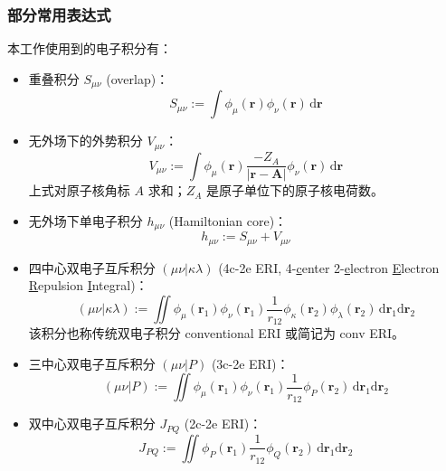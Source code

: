 \subsubsection{部分常用表达式}

本工作使用到的电子积分有：
\begin{itemize}[nosep]
  \item 重叠积分 $S_{\mu \nu}$ (overlap)：
        \begin{equation}
          S_{\mu \nu} := \int \phi_\mu (\bm{r}) \phi_\nu (\bm{r}) \, \mathrm{d} \bm{r}
        \end{equation}
  \item 无外场下的外势积分 $V_{\mu \nu}$：
        \begin{equation}
          V_{\mu \nu} := \int \phi_\mu (\bm{r}) \frac{- Z_A}{|\bm{r} - \bm{A}|} \phi_\nu (\bm{r}) \, \mathrm{d} \bm{r}
        \end{equation}
        上式对原子核角标 $A$ 求和；$Z_A$ 是原子单位下的原子核电荷数。
  \item 无外场下单电子积分 $h_{\mu \nu}$ (Hamiltonian core)：
        \begin{equation}
          h_{\mu \nu} := S_{\mu \nu} + V_{\mu \nu}
        \end{equation}
  \item 四中心双电子互斥积分 $(\mu \nu | \kappa \lambda)$ (4c-2e ERI, 4-\underline{c}enter 2-\underline{e}lectron \underline{E}lectron \underline{R}epulsion \underline{I}ntegral)：
        \begin{equation}
          (\mu \nu | \kappa \lambda) := \iint \phi_\mu (\bm{r}_1) \phi_\nu (\bm{r}_1) \frac{1}{r_{12}} \phi_\kappa (\bm{r}_2) \phi_\lambda (\bm{r}_2) \, \mathrm{d} \bm{r}_1 \mathrm{d} \bm{r}_2
        \end{equation}
        该积分也称传统双电子积分 conventional ERI 或简记为 conv ERI。
  \item 三中心双电子互斥积分 $(\mu \nu | P)$ (3c-2e ERI)：
        \begin{equation}
          (\mu \nu | P) := \iint \phi_\mu (\bm{r}_1) \phi_\nu (\bm{r}_1) \frac{1}{r_{12}} \phi_P (\bm{r}_2) \, \mathrm{d} \bm{r}_1 \mathrm{d} \bm{r}_2
        \end{equation}
  \item 双中心双电子互斥积分 $J_{PQ}$ (2c-2e ERI)：
        \begin{equation}
          J_{PQ} := \iint \phi_P (\bm{r}_1) \frac{1}{r_{12}} \phi_Q (\bm{r}_2) \, \mathrm{d} \bm{r}_1 \mathrm{d} \bm{r}_2
        \end{equation}
\end{itemize}

